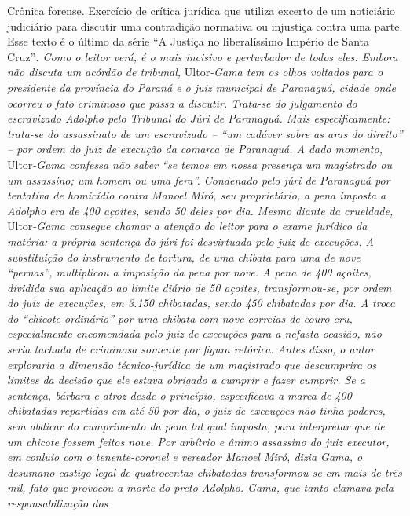 \begin{didascalia}
Crônica forense. Exercício de crítica jurídica que utiliza excerto de um
noticiário judiciário para discutir uma contradição normativa ou
injustiça contra uma parte. Esse texto é o último da série ``A Justiça
no liberalíssimo Império de Santa Cruz''\emph{. Como o leitor verá, é o
mais incisivo e perturbador de todos eles. Embora não discuta um acórdão
de tribunal,} Ultor\emph{-Gama tem os olhos voltados para o presidente
da província do Paraná e o juiz municipal de Paranaguá, cidade onde
ocorreu o fato criminoso que passa a discutir. Trata-se do julgamento do
escravizado Adolpho pelo Tribunal do Júri de Paranaguá. Mais
especificamente: trata-se do assassinato de um escravizado -- ``um
cadáver sobre as aras do direito'' -- por ordem do juiz de execução da
comarca de Paranaguá. A dado momento,} Ultor\emph{-Gama confessa não
saber ``se temos em nossa presença um magistrado ou um assassino; um
homem ou uma fera''. Condenado pelo júri de Paranaguá por tentativa de
homicídio contra Manoel Miró, seu proprietário, a pena imposta a Adolpho
era de 400 açoites, sendo 50 deles por dia. Mesmo diante da crueldade,}
Ultor\emph{-Gama consegue chamar a atenção do leitor para o exame
jurídico da matéria: a própria sentença do júri foi desvirtuada pelo
juiz de execuções. A substituição do instrumento de tortura, de uma
chibata para uma de nove ``pernas'', multiplicou a imposição da pena por
nove. A pena de 400 açoites, dividida sua aplicação ao limite diário de
50 açoites, transformou-se, por ordem do juiz de execuções, em 3.150
chibatadas, sendo 450 chibatadas por dia. A troca do ``chicote ordinário''
por uma chibata com nove correias de couro cru, especialmente
encomendada pelo juiz de execuções para a nefasta ocasião, não seria
tachada de criminosa somente por figura retórica. Antes disso, o autor
exploraria a dimensão técnico-jurídica de um magistrado que descumprira
os limites da decisão que ele estava obrigado a cumprir e fazer cumprir.
Se a sentença, bárbara e atroz desde o princípio, especificava a marca
de 400 chibatadas repartidas em até 50 por dia, o juiz de execuções não
tinha poderes, sem abdicar do cumprimento da pena tal qual imposta, para
interpretar que de um chicote fossem feitos nove. Por arbítrio e ânimo
assassino do juiz executor, em conluio com o tenente-coronel e vereador
Manoel Miró, dizia Gama, o desumano castigo legal de quatrocentas
chibatadas transformou-se em mais de três mil, fato que provocou a morte
do preto Adolpho. Gama, que tanto clamava pela responsabilização dos
}
\end{didascalia}
